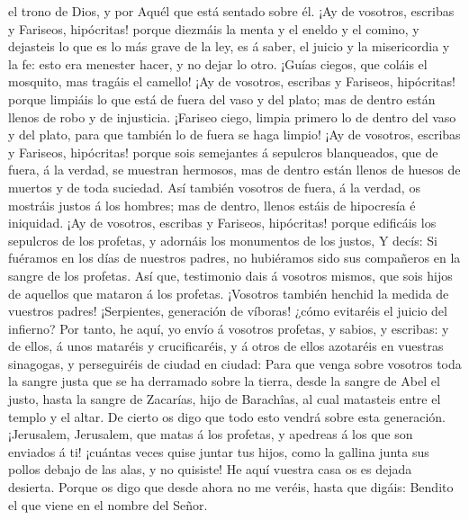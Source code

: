 el trono de Dios, y por Aquél que está sentado sobre él. 
¡Ay de vosotros, escribas y Fariseos, hipócritas! porque diezmáis la
menta y el eneldo y el comino, y dejasteis lo que es lo más grave de la
ley, es á saber, el juicio y la misericordia y la fe: esto era menester
hacer, y no dejar lo otro.  ¡Guías ciegos, que coláis el
mosquito, mas tragáis el camello!  ¡Ay de vosotros,
escribas y Fariseos, hipócritas! porque limpiáis lo que está de fuera
del vaso y del plato; mas de dentro están llenos de robo y de
injusticia.  ¡Fariseo ciego, limpia primero lo de dentro
del vaso y del plato, para que también lo de fuera se haga limpio!
 ¡Ay de vosotros, escribas y Fariseos, hipócritas! porque
sois semejantes á sepulcros blanqueados, que de fuera, á la verdad, se
muestran hermosos, mas de dentro están llenos de huesos de muertos y de
toda suciedad.  Así también vosotros de fuera, á la
verdad, os mostráis justos á los hombres; mas de dentro, llenos estáis
de hipocresía é iniquidad.  ¡Ay de vosotros, escribas y
Fariseos, hipócritas! porque edificáis los sepulcros de los profetas, y
adornáis los monumentos de los justos,  Y decís: Si
fuéramos en los días de nuestros padres, no hubiéramos sido sus
compañeros en la sangre de los profetas.  Así que,
testimonio dais á vosotros mismos, que sois hijos de aquellos que
mataron á los profetas.  ¡Vosotros también henchid la
medida de vuestros padres!  ¡Serpientes, generación de
víboras! ¿cómo evitaréis el juicio del infierno?  Por
tanto, he aquí, yo envío á vosotros profetas, y sabios, y escribas: y de
ellos, á unos mataréis y crucificaréis, y á otros de ellos azotaréis en
vuestras sinagogas, y perseguiréis de ciudad en ciudad: 
Para que venga sobre vosotros toda la sangre justa que se ha derramado
sobre la tierra, desde la sangre de Abel el justo, hasta la sangre de
Zacarías, hijo de Barachîas, al cual matasteis entre el templo y el
altar.  De cierto os digo que todo esto vendrá sobre esta
generación.  ¡Jerusalem, Jerusalem, que matas á los
profetas, y apedreas á los que son enviados á ti! ¡cuántas veces quise
juntar tus hijos, como la gallina junta sus pollos debajo de las alas, y
no quisiste!  He aquí vuestra casa os es dejada desierta.
 Porque os digo que desde ahora no me veréis, hasta que
digáis: Bendito el que viene en el nombre del Señor.

